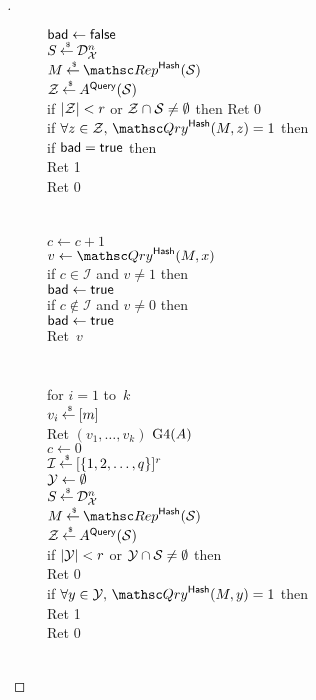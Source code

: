 \begin{proof}[]
\begin{figure}
{{$\mathsf{bad} \gets \mathsf{false}$\\
$S {\:\stackrel{{\scriptscriptstyle \hspace{0.2em}\$}} {\leftarrow}\:} \mathcal{D}_{{\cal X}}^{n}$\\
$M \getsr \Rep^{\HashOracle}(\calS)$\\
${\cal Z} {\:\stackrel{{\scriptscriptstyle \hspace{0.2em}\$}} {\leftarrow}\:} A^{\mathsf{Query}}({\cal S})$\\
if $|{\cal Z}| < r$ or ${\cal Z} \cap {\cal S} \neq \emptyset$ then Ret 0\\
if $\forall z \in \calZ,\,\Qry^{\HashOracle}(M,z)=1$ then \\
\nudge if $\mathsf{bad}=\mathsf{true}$ then \\
\nudge Ret 1\\
Ret 0\\\\
%
\\
$c \gets c+1$\\
$v \gets \Qry^{\HashOracle}(M,x)$\\
if $c \in \mathcal{I}$ and $v\neq 1$ then\\
\nudge $\mathsf{bad} \gets \mathsf{true}$ \\
if $c \not\in \mathcal{I}$ and $v\neq 0$ then\\
\nudge $\mathsf{bad} \gets \mathsf{true}$\\
Ret~$v$\\\\
%
\\
for $i = 1$ to~$k$\\
\nudge $v_i  {\:\stackrel{{\scriptscriptstyle \hspace{0.2em}\$}} {\leftarrow}\:} [m]$\\
Ret $\left(v_1,\ldots,v_k\right)$
}
{
\underline{$\text{G4}(A)$}\\
$c \gets 0$\\
$\mathcal{I}{\:\stackrel{{\scriptscriptstyle \hspace{0.2em}\$}} {\leftarrow}\:} [\{1,2,\ldots,q\}]^r$\\
${\cal Y} \gets \emptyset$\\
$S {\:\stackrel{{\scriptscriptstyle \hspace{0.2em}\$}} {\leftarrow}\:} \mathcal{D}_{{\cal X}}^{n}$\\
$M \getsr \Rep^{\HashOracle}(\calS)$\\
${\cal Z} {\:\stackrel{{\scriptscriptstyle \hspace{0.2em}\$}} {\leftarrow}\:} A^{\mathsf{Query}}({\cal S})$\\
if $|{\cal Y}| < r$ or ${\cal Y} \cap {\cal S} \neq \emptyset$ then\\
\nudge Ret 0\\
if $\forall y \in \calY,\,\Qry^{\HashOracle}(M,y)=1$ then \\
\nudge Ret 1\\
Ret 0\\\\
}}
\end{figure}
\end{proof}
